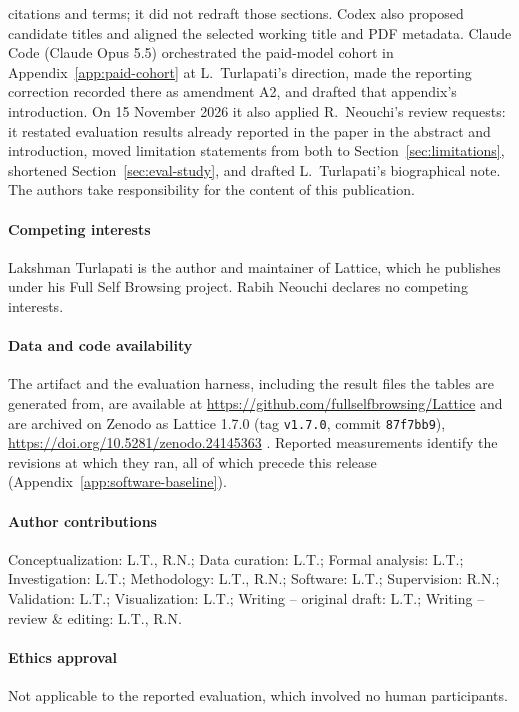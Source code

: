 \documentclass[11pt]{article}
\newcommand{\code}[1]{\texttt{\small #1}}
\begin{document}
citations and terms; it did not redraft those sections. Codex also proposed candidate titles and aligned the selected working title and PDF metadata. Claude Code (Claude Opus 5.5) orchestrated the paid-model cohort in Appendix~\ref{app:paid-cohort} at L.~Turlapati's direction, made the reporting correction recorded there as amendment A2, and drafted that appendix's introduction. On 15 November 2026 it also applied R.~Neouchi's review requests: it restated evaluation results already reported in the paper in the abstract and introduction, moved limitation statements from both to Section~\ref{sec:limitations}, shortened Section~\ref{sec:eval-study}, and drafted L.~Turlapati's biographical note. The authors take responsibility for the content of this publication.
\paragraph{Competing interests} Lakshman Turlapati is the author and maintainer of Lattice, which he publishes under his Full Self Browsing project. Rabih Neouchi declares no competing interests.
\paragraph{Data and code availability} The artifact and the evaluation harness, including the result files the tables are generated from, are available at \url{https://github.com/fullselfbrowsing/Lattice} and are archived on Zenodo as Lattice 1.7.0 (tag \code{v1.7.0}, commit \code{87f7bb9}), \url{https://doi.org/10.5281/zenodo.24145363} \citep{lattice}. Reported measurements identify the revisions at which they ran, all of which precede this release (Appendix~\ref{app:software-baseline}).
\paragraph{Author contributions} Conceptualization: L.T., R.N.; Data curation: L.T.; Formal analysis: L.T.; Investigation: L.T.; Methodology: L.T., R.N.; Software: L.T.; Supervision: R.N.; Validation: L.T.; Visualization: L.T.; Writing -- original draft: L.T.; Writing -- review \& editing: L.T., R.N.
\paragraph{Ethics approval} Not applicable to the reported evaluation, which involved no human participants.
\end{document}
